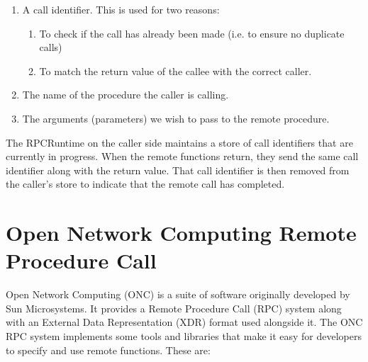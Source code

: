 \begin{enumerate}
	\item A call identifier. This is used for two reasons:
	\begin{enumerate}
		\item To check if the call has already been made (i.e. to ensure no duplicate calls)
		\item To match the return value of the callee with the correct caller.
	\end{enumerate}
	\item The name of the procedure the caller is calling.
	\item The arguments (parameters) we wish to pass to the remote procedure.
\end{enumerate}

The RPCRuntime on the caller side maintains a store of call identifiers that are currently in progress. When the remote functions return, they send the same call identifier along with the return value. That call identifier is then removed from the caller's store to indicate that the remote call has completed.


\section{Open Network Computing Remote Procedure Call}
\label{ONCRPCBackgroundSection} 
Open Network Computing (ONC) is a suite of software originally developed by Sun Microsystems. It provides a Remote Procedure Call (RPC) system along with an External Data Representation (XDR) format used alongside it. The ONC RPC system implements some tools and libraries that make it easy for developers to specify and use remote functions. These are:

